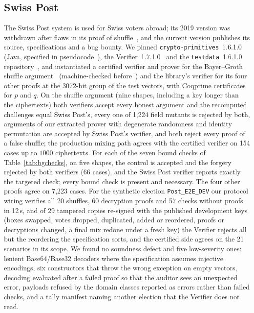 \subsection{Swiss Post}\label{sec:cs:swisspost}
The Swiss Post system is used for Swiss voters abroad; its 2019 version
was withdrawn after flaws in its proof of shuffle~\cite{9152765}, and the
current version publishes its source, specifications and a bug bounty.
We pinned \texttt{crypto-primitives}~1.6.1.0 (Java, specified in
pseudocode~\cite{swisspost_cryptoprimitives_spec}), the
Verifier~1.7.1.0~\cite{swisspost_verifier_spec} and the
\texttt{testdata}~1.6.1.0 repository~\cite{swisspost_testdata}, and
instantiated a certified verifier and prover for the Bayer--Groth shuffle
argument~\cite{10.1007/978-3-642-29011-4_17} (machine-checked
before~\cite{287095}) and the library's verifier for its four other
proofs at the 3072-bit group of the test vectors, with Coqprime
certificates for $p$ and $q$. On the shuffle argument (nine shapes,
including a key longer than the ciphertexts) both verifiers accept every
honest argument and the recomputed challenges equal Swiss Post's, every
one of 1{,}224 field mutants is rejected by both, arguments of our
extracted prover with degenerate randomness and identity permutation are
accepted by Swiss Post's verifier, and both reject every proof of a false
shuffle; the production mixing path agrees with the certified verifier on
154 cases up to $1000$ ciphertexts. For each of the seven bound checks of
Table~\ref{tab:bgchecks}, on five shapes, the control is accepted and the
forgery rejected by both verifiers (66 cases), and the Swiss Post verifier
reports exactly the targeted check; every bound check is present and
necessary. The four other proofs agree on 7{,}223 cases. For the synthetic
election \texttt{Post\_E2E\_DEV} our protocol wiring verifies all 20
shuffles, 60 decryption proofs and 57 checks without proofs in 12\,s,
and of 29 tampered copies re-signed with the published development keys
(boxes swapped, votes dropped, duplicated, added or reordered, proofs or
decryptions changed, a final mix redone under a fresh key) the Verifier
rejects all but the reordering the specification sorts, and the certified
side agrees on the 21 scenarios in its scope. We found no soundness
defect and five low-severity ones: lenient Base64/Base32 decoders where
the specification assumes injective encodings, six constructors that
throw the wrong exception on empty vectors, decoding evaluated after a
failed proof so that the auditor sees an unexpected error, payloads
refused by the domain classes reported as errors rather than failed
checks, and a tally manifest naming another election that the Verifier
does not read.

